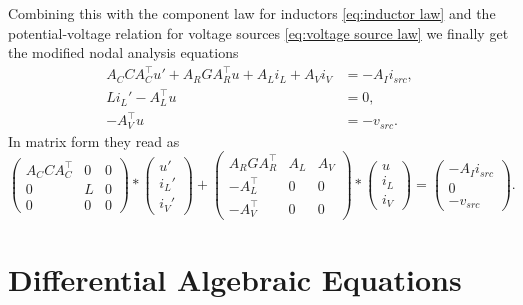 	\begin{frame}
		Combining this with the component law for inductors \eqref{eq:inductor law} and the potential-voltage relation for voltage sources \eqref{eq:voltage source law} we finally get the modified nodal analysis equations
		\begin{displaymath}
			\begin{aligned}
				A_C C A_C^\top u' + A_R G A_R^\top u + A_L i_L + A_V i_V &= - A_I i_{src} , \\
				L i_L'	- A_L^\top u &= 0 , \\
				-A_V^\top u &=  -v_{src}.
			\end{aligned}	
		\end{displaymath}
		In matrix form they read as
		\begin{equation}
			\label{MNA_Matrixform}
			\begin{pmatrix}
				A_C C A_C^\top & 0 & 0 \\
				0 & L & 0 \\
				0 & 0 & 0
			\end{pmatrix}
			*
			\begin{pmatrix}
				u' \\
				i_L' \\
				i_V'
			\end{pmatrix}
			+
			\begin{pmatrix}
				A_R G A_R^\top & A_L & A_V \\
				-A_L^\top & 0 & 0 \\
				-A_V^\top & 0 & 0 
			\end{pmatrix}
			*
			\begin{pmatrix}
				u \\
				i_L \\
				i_V
			\end{pmatrix}
			=
			\begin{pmatrix}
				-A_I i_{src} \\
				0 \\
				-v_{src}
			\end{pmatrix} . 
		\end{equation}
	\end{frame}

\section{Differential Algebraic Equations}
